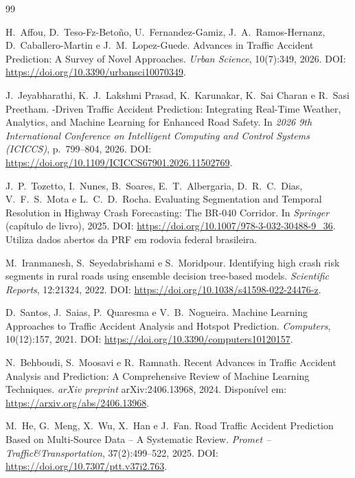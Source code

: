     \begin{thebibliography}{99}


    H.~Affou, D.~Teso-Fz-Beto{\~n}o, U.~Fernandez-Gamiz, J.~A.~Ramos-Hernanz, D.~Caballero-Martin e J.~M.~Lopez-Guede.
    \newblock Advances in Traffic Accident Prediction: A Survey of Novel Approaches.
    \newblock \emph{Urban Science}, 10(7):349, 2026.
    \newblock DOI: \url{https://doi.org/10.3390/urbansci10070349}.

    J.~Jeyabharathi, K.~J.~Lakshmi Prasad, K.~Karunakar, K.~Sai Charan e R.~Sasi Preetham.
    -Driven Traffic Accident Prediction: Integrating Real-Time Weather, Analytics, and Machine Learning for Enhanced Road Safety.
    \newblock In \emph{2026 9th International Conference on Intelligent Computing and Control Systems (ICICCS)}, p.~799--804, 2026.
    \newblock DOI: \url{https://doi.org/10.1109/ICICCS67901.2026.11502769}.

    J.~P.~Tozetto, I.~Nunes, B.~Soares, E.~T.~Albergaria, D.~R.~C.~Dias, V.~F.~S.~Mota e L.~C.~D.~Rocha.
    \newblock Evaluating Segmentation and Temporal Resolution in Highway Crash Forecasting: The {BR-040} Corridor.
    \newblock In \emph{Springer} (capítulo de livro), 2025.
    \newblock DOI: \url{https://doi.org/10.1007/978-3-032-30488-9_36}.
    \newblock Utiliza dados abertos da {PRF} em rodovia federal brasileira.

    M.~Iranmanesh, S.~Seyedabrishami e S.~Moridpour.
    \newblock Identifying high crash risk segments in rural roads using ensemble decision tree-based models.
    \newblock \emph{Scientific Reports}, 12:21324, 2022.
    \newblock DOI: \url{https://doi.org/10.1038/s41598-022-24476-z}.

    D.~Santos, J.~Saias, P.~Quaresma e V.~B.~Nogueira.
    \newblock Machine Learning Approaches to Traffic Accident Analysis and Hotspot Prediction.
    \newblock \emph{Computers}, 10(12):157, 2021.
    \newblock DOI: \url{https://doi.org/10.3390/computers10120157}.

    N.~Behboudi, S.~Moosavi e R.~Ramnath.
    \newblock Recent Advances in Traffic Accident Analysis and Prediction: A Comprehensive Review of Machine Learning Techniques.
    \newblock \emph{arXiv preprint} arXiv:2406.13968, 2024.
    \newblock Dispon{\'i}vel em: \url{https://arxiv.org/abs/2406.13968}.

    M.~He, G.~Meng, X.~Wu, X.~Han e J.~Fan.
    \newblock Road Traffic Accident Prediction Based on Multi-Source Data -- A Systematic Review.
    \newblock \emph{Promet -- Traffic\&Transportation}, 37(2):499--522, 2025.
    \newblock DOI: \url{https://doi.org/10.7307/ptt.v37i2.763}.


\end{thebibliography}
